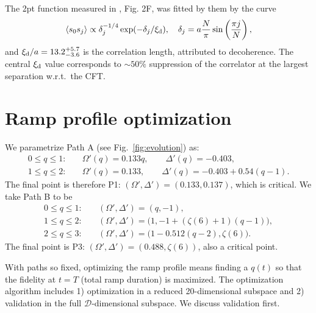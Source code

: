 \documentclass[a4paper,12pt]{article}
\theoremstyle{remark}
\theoremstyle{theorem}
\begin{document}
The 2pt function measured in {\cite{Fang:2024uyf}}, Fig. 2F, was fitted by
them by the curve
\begin{equation}
	\langle s_0 s_j \rangle \propto \delta^{- 1 / 4}_j \exp (- \delta_j / \xi_{\rm d} ),
	\quad \delta_j = a \frac{N}{\pi} \sin \left( \frac{\pi j}{N} \right),
\end{equation}
and $\xi_{\rm d} / a = 13.2^{+ 5.7}_{- 3.6}$ is the correlation length, attributed to
decoherence. The central $\xi_{\rm d}$ value corresponds to $\sim50\%$ suppression of
the correlator at the largest separation w.r.t.~the CFT.

\section{Ramp profile optimization}\label{sec:optim}

We parametrize Path A (see Fig.~\ref{fig:evolution}) as:
\begin{align}
0\leq q\leq1:&\quad
\Omega'(q)=0.133q,\qquad \Delta'(q)=-0.403, \nonumber\\
1\leq q\leq2:&\quad
\Omega'(q)=0.133,\qquad \Delta'(q)=-0.403+0.54(q-1). \label{eq:PA}
\end{align}
The final point is therefore P1: $(\Omega',\Delta')=(0.133,0.137)$, which is critical.
We take Path B to be 
\begin{align}\label{PathB}
0\leq q\leq1:&\quad (\Omega',\Delta')=(q,-1), \nonumber\\
1\leq q\leq2:&\quad (\Omega',\Delta')=\bigl(1,-1+(\zeta(6)+1)(q-1)\bigr), \nonumber\\
2\leq q\leq3:&\quad (\Omega',\Delta')=\bigl(1-0.512(q-2),\zeta(6)\bigr). 
\end{align}
The final point is P3: $(\Omega',\Delta')=(0.488,\zeta(6))$, also a critical point.

With paths so fixed, optimizing the ramp profile means finding a $q(t)$ so that the fidelity at $t=T$ (total ramp duration) is maximized. The optimization algorithm includes 1) optimization in a reduced 20-dimensional
subspace and 2) validation in the full $\mathcal{D}$-dimensional subspace. We discuss validation first.
\end{document}
